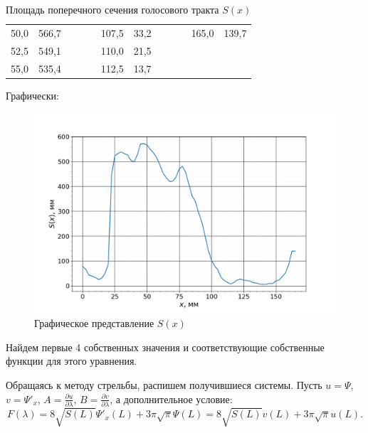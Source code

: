 \begin{table}[h!]
\begin{tabular}{|c|c|ccc|c|c|ccccc}
				50,0    & 566,7          &  &  &  & 107,5   & 33,2           &  &  & \multicolumn{1}{c|}{} & \multicolumn{1}{c|}{165,0}   & \multicolumn{1}{c|}{139,7}          \\ \cline{1-2} \cline{6-7} \cline{11-12} 
				52,5    & 549,1          &  &  &  & 110,0   & 21,5           &  &  &                       &                              &                                     \\ \cline{1-2} \cline{6-7}
				55,0    & 535,4          &  &  &  & 112,5   & 13,7           &  &  &                       &                              &                                     \\ \cline{1-2} \cline{6-7}
			\end{tabular}
			\caption{Площадь поперечного сечения голосового тракта $S(x)$}
		\end{table}
	
		\newpage
		Графически:
		\begin{figure}[h!]
			\centering
			\includegraphics[width=0.95\linewidth]{Pictures/VoicePlot.png}
			\caption{Графическое представление $S(x)$}
		\end{figure}
	
		Найдем первые 4 собственных значения и соответствующие собственные функции для этого уравнения. 
		
		Обращаясь к методу стрельбы, распишем получившиеся системы. Пусть $u = \Psi$, $v = \Psi'_x$, $A = \frac{\partial u}{\partial \lambda}$, $B = \frac{\partial v}{\partial \lambda}$, а дополнительное условие:
		\begin{equation*}
			F(\lambda) = 8\sqrt{S(L)}\Psi'_x(L) + 3\pi\sqrt{\pi}\Psi(L) = 8\sqrt{S(L)}v(L) + 3\pi\sqrt{\pi}u(L).
		\end{equation*}
	
